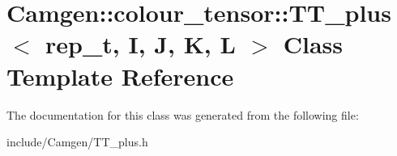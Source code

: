 \hypertarget{a00554}{}\section{Camgen\+:\+:colour\+\_\+tensor\+:\+:T\+T\+\_\+plus$<$ rep\+\_\+t, I, J, K, L $>$ Class Template Reference}
\label{a00554}


The documentation for this class was generated from the following file\+:\begin{DoxyCompactItemize}
\item 
include/\+Camgen/T\+T\+\_\+plus.\+h\end{DoxyCompactItemize}
